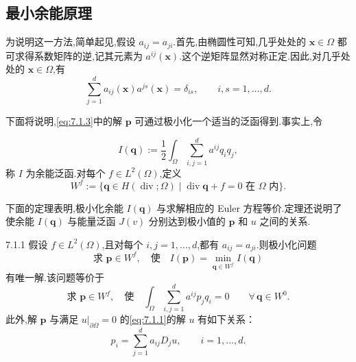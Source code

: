 \subsection{最小余能原理}\label{sec:7.1.1}

为说明这一方法,简单起见,假设 \(a_{ij}=a_{ji}\).首先,由椭圆性可知,几乎处处的 \(\boldsymbol{x}\in\Omega\) 都可求得系数矩阵的逆,记其元素为 \(a^{ij}(\boldsymbol{x})\).这个逆矩阵显然对称正定.因此,对几乎处处的 \(\boldsymbol{x}\in\Omega\),有
\begin{equation}\label{eq:7.1.4}
  \sum_{j=1}^d a_{ij}(\boldsymbol{x})a^{js}(\boldsymbol{x})=\delta_{is},
    \qquad i,s=1,\ldots,d.
\end{equation}

下面将说明,\eqref{eq:7.1.3}中的解 \(\boldsymbol{p}\) 可通过极小化一个适当的泛函得到.事实上,令
\begin{definition*}
\begin{equation}\label{eq:7.1.5}
  I(\boldsymbol{q}):=\frac12\int_\Omega\sum_{i,j=1}^d a^{ij}q_iq_j,
\end{equation}
称 \(I\) 为{\heiti 余能泛函}.对每个 \(f\in L^2(\Omega)\),定义
\begin{equation}\label{eq:7.1.6}
  W^f:=\{\boldsymbol{q}\in H(\operatorname{div};\Omega)
        \mid\operatorname{div}\boldsymbol{q}+f=0\text{ 在 }\Omega\text{ 内}\}.
\end{equation}
\end{definition*}

下面的定理表明,极小化余能 \(I(\boldsymbol{q})\) 与求解相应的 Euler 方程等价.定理还说明了使余能 \(I(\boldsymbol{q})\) 与能量泛函 \(J(v)\) 分别达到极小值的 \(\boldsymbol{p}\) 和 \(u\) 之间的关系.

\begin{theorem}[]{7.1.1}
假设 \(f\in L^2(\Omega)\),且对每个 \(i,j=1,\ldots,d\),都有 \(a_{ij}=a_{ji}\).则极小化问题
\begin{equation}\label{eq:7.1.7}
  \text{求 }\boldsymbol{p}\in W^f,\quad\text{使}\quad
    I(\boldsymbol{p})=\min_{\boldsymbol{q}\in W^f} I(\boldsymbol{q})
\end{equation}
有唯一解.该问题等价于
\begin{equation}\label{eq:7.1.8}
  \text{求 }\boldsymbol{p}\in W^f,\quad\text{使}\quad
    \int_\Omega\sum_{i,j=1}^d a^{ij}p_jq_i=0\qquad\forall\,\boldsymbol{q}\in W^0.
\end{equation}
此外,解 \(\boldsymbol{p}\) 与满足 \(u|_{\partial\Omega}=0\) 的\eqref{eq:7.1.1}的解 \(u\) 有如下关系：
\begin{equation}\label{eq:7.1.9}
  p_i=\sum_{j=1}^d a_{ij}D_ju,\qquad i=1,\ldots,d.
\end{equation}
\end{theorem}

